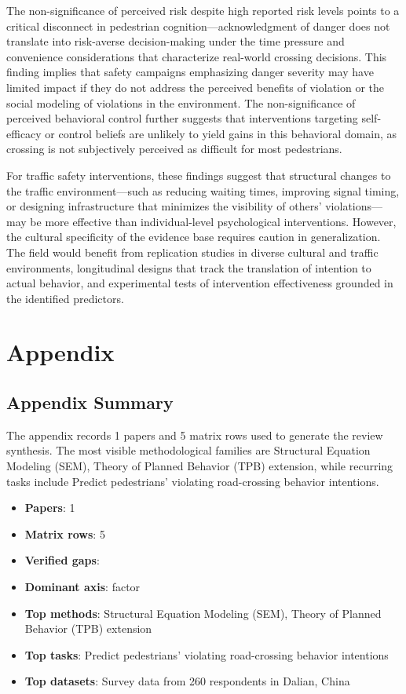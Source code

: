 \documentclass{article}
\begin{document}
The non-significance of perceived risk despite high reported risk levels points to a critical disconnect in pedestrian cognition—acknowledgment of danger does not translate into risk-averse decision-making under the time pressure and convenience considerations that characterize real-world crossing decisions. This finding implies that safety campaigns emphasizing danger severity may have limited impact if they do not address the perceived benefits of violation or the social modeling of violations in the environment. The non-significance of perceived behavioral control further suggests that interventions targeting self-efficacy or control beliefs are unlikely to yield gains in this behavioral domain, as crossing is not subjectively perceived as difficult for most pedestrians. \cite{08_2016_zhou_aap}

For traffic safety interventions, these findings suggest that structural changes to the traffic environment—such as reducing waiting times, improving signal timing, or designing infrastructure that minimizes the visibility of others' violations—may be more effective than individual-level psychological interventions. However, the cultural specificity of the evidence base requires caution in generalization. The field would benefit from replication studies in diverse cultural and traffic environments, longitudinal designs that track the translation of intention to actual behavior, and experimental tests of intervention effectiveness grounded in the identified predictors. \cite{08_2016_zhou_aap}

\appendix
\section{Appendix}
\subsection{Appendix Summary}
\noindent The appendix records 1 papers and 5 matrix rows used to generate the review synthesis. The most visible methodological families are Structural Equation Modeling (SEM), Theory of Planned Behavior (TPB) extension, while recurring tasks include Predict pedestrians' violating road-crossing behavior intentions.

\begin{itemize}
\item \textbf{Papers}: 1
\item \textbf{Matrix rows}: 5
\item \textbf{Verified gaps}: 
\item \textbf{Dominant axis}: factor
\item \textbf{Top methods}: Structural Equation Modeling (SEM), Theory of Planned Behavior (TPB) extension
\item \textbf{Top tasks}: Predict pedestrians' violating road-crossing behavior intentions
\item \textbf{Top datasets}: Survey data from 260 respondents in Dalian, China
\end{itemize}
\end{document}
